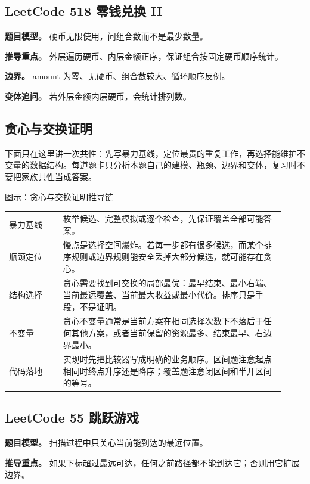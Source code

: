 \subsection{LeetCode 518 零钱兑换 II}

\textbf{题目模型。} 硬币无限使用，问组合数而不是最少数量。

\textbf{推导重点。} 外层遍历硬币、内层金额正序，保证组合按固定硬币顺序统计。

\textbf{边界。} amount 为零、无硬币、组合数较大、循环顺序反例。

\textbf{变体追问。} 若外层金额内层硬币，会统计排列数。

\subsection{贪心与交换证明}
下面只在这里讲一次共性：先写暴力基线，定位最贵的重复工作，再选择能维护不变量的数据结构。每道题卡只分析本题自己的建模、瓶颈、边界和变体，复习时不要把家族共性当成答案。

\begin{principlebox}{图示：贪心与交换证明推导链}
\begin{tabular}{@{}p{0.18\linewidth}p{0.74\linewidth}@{}}
暴力基线 & 枚举候选、完整模拟或逐个检查，先保证覆盖全部可能答案。\\
瓶颈定位 & 慢点是选择空间爆炸。若每一步都有很多候选，而某个排序规则或边界规则能安全丢掉大部分候选，就可能存在贪心。\\
结构选择 & 贪心需要找到可交换的局部最优：最早结束、最小右端、当前最远覆盖、当前最大收益或最小代价。排序只是手段，不是证明。\\
不变量 & 贪心不变量通常是当前方案在相同选择次数下不落后于任何其他方案，或者当前保留的资源最多、结束最早、右边界最小。\\
代码落地 & 实现时先把比较器写成明确的业务顺序。区间题注意起点相同时终点升序还是降序；覆盖题注意闭区间和半开区间的等号。\\
\end{tabular}
\end{principlebox}

\subsection{LeetCode 55 跳跃游戏}

\textbf{题目模型。} 扫描过程中只关心当前能到达的最远位置。

\textbf{推导重点。} 如果下标超过最远可达，任何之前路径都不能到达它；否则用它扩展边界。

